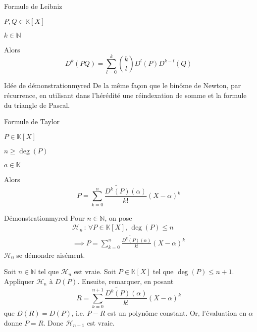    \begin{theo}{Formule de Leibniz}{}
        \begin{soient}
            \item $P,Q \in \mathbb{K}[X]$
            \item $k \in \mathbb{N}$
        \end{soient}
    
        Alors \[ D^k(PQ) = \sum\limits_{l=0}^k \binom{k}{l} D^l(P) D^{k-l}(Q) \]
    \end{theo}
    
    \begin{demo}{Idée de démonstration}{myred}
        De la même façon que le binôme de Newton, par récurrence, en utilisant dans l’hérédité une réindexation de somme et la formule du triangle de Pascal.
    \end{demo}

    \begin{theo}{Formule de Taylor}{}
        \begin{soient}
            \item $P \in \mathbb{K}[X]$
            \item $n \geq \deg(P)$
            \item $a \in \mathbb{K}$
        \end{soient}
    
        Alors \[ P = \sum\limits_{k=0}^n \frac{\widetilde{D^k(P)}(\alpha)}{k!}(X-\alpha)^k \]
    \end{theo}
    
    \begin{demo}{Démonstration}{myred}
        Pour $n \in \mathbb{N}$, on pose \begin{multline*}
            \mathcal{H}_n \, : \, \forall P \in \mathbb{K}[X], \, \deg(P) \leq n \\
            \implies P = \sum\limits_{k=0}^n \frac{\widetilde{D^k(P)}(\alpha)}{k!}(X-\alpha)^k
        \end{multline*}
        $\mathcal{H}_0$ se démondre aisément.
        
        Soit $n \in \mathbb{N}$ tel que $\mathcal{H}_n$ est vraie. Soit $P \in \mathbb{K}[X]$ tel que $\deg(P) \leq n+1$. 
        Appliquer $\mathcal{H}_n$ à $D(P)$. Ensuite, remarquer, en posant 
        \[ R = \sum\limits_{k=0}^{n+1} \frac{\widetilde{D^k(P)}(\alpha)}{k!}(X-\alpha)^k \]
        que $D(R) = D(P)$, i.e. $P-R$ est un polynôme constant. Or, l’évaluation en $\alpha$ donne $P = R$. Donc $\mathcal{H}_{n+1}$ est vraie.
    \end{demo}
    
